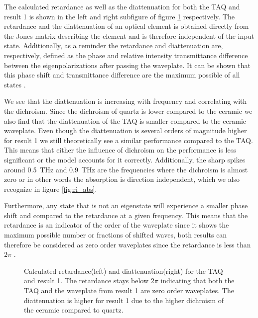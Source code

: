 The calculated retardance as well as the diattenuation for both the TAQ and result 1 is shown in the left and right subfigure of figure \ref{fig:cl4_ret_diat} respectively. The retardance and the diattenuation of an optical element is obtained directly from the Jones matrix describing the element and is therefore independent of the input state. Additionally, as a reminder the retardance and diattenuation are, respectively, defined as the phase and relative intensity transmittance difference between the eigenpolarizations after passing the waveplate. It can be shown that this phase shift and transmittance difference are the maximum possible of all states \cite{Lu1994}. 

We see that the diattenuation is increasing with frequency and correlating with the dichroism. Since the dichroism of quartz is lower compared to the  ceramic we also find that the diattenuation of the TAQ is smaller compared to the ceramic waveplate. Even though the diattenuation is several orders of magnitude higher for result 1 we still theoretically see a similar performance compared to the TAQ. This means that either the influence of dichroism on the performance is less significant or the model accounts for it correctly. Additionally, the sharp spikes around \SI{0.5}{\tera \hertz} and \SI{0.9}{\tera \hertz} are the frequencies where the dichroism is almost zero or in other words the absorption is direction independent, which we also recognize in figure \ref{fig:ri_abs}. 

Furthermore, any state that is not an eigenstate will experience a smaller phase shift and compared to the retardance at a given frequency. This means that the retardance is an indicator of the order of the waveplate since it shows the maximum possible number or fractions of shifted waves, both results can therefore be considered as zero order waveplates since the retardance is less than $2\pi$ \cite{Samoylov2004}. 

\begin{figure}[H]
    \centering
    
    \caption{Calculated retardance(left) and diattenuation(right) for the TAQ and result 1. The retardance stays below $2\pi$ indicating that both the TAQ and the waveplate from result 1 are zero order waveplates. The diattenuation is higher for result 1 due to the higher dichroism of the  ceramic compared to quartz.}%
    \label{fig:cl4_ret_diat}
\end{figure}


